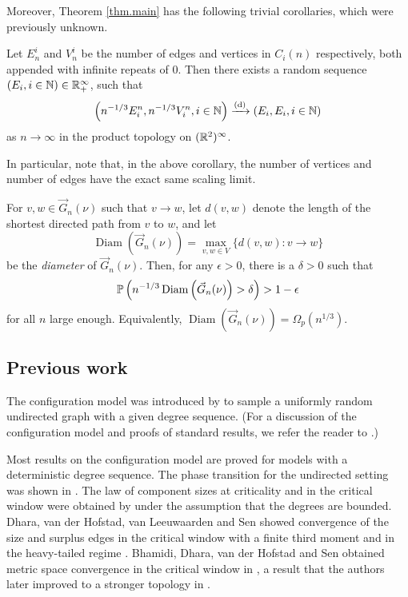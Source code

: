 Moreover, Theorem \ref{thm.main} has the following trivial corollaries, which were previously unknown. 
\begin{corollary}\label{cor.componentsizes}
Let $E^i_n$ and $V^i_n$ be the number of edges and vertices in $C_i(n)$ respectively, both appended with infinite repeats of $0$. Then there exists a random sequence $(E_i,i\in \N)\in \R_+^\infty$, such that
$$\left(n^{-1/3}E^n_i,n^{-1/3}V^n_i, i\in \N\right)\todist\left(E_i,E_i,i\in \N\right)$$
as $n\to \infty$ in the product topology on $(\R^2)^\infty$. 
\end{corollary}
In particular, note that, in the above corollary, the number of vertices and number of edges have the exact same scaling limit.
\begin{corollary}\label{cor.diameter}
For $v,w\in \vec{G}_n(\nu)$ such that $v\to w$, let $d(v,w)$ denote the length of the shortest directed path from $v$ to $w$, and let $$\operatorname{Diam}\left(\vec{G}_n(\nu)\right)=\max_{v,w\in V}\{d(v,w):v\to w\}$$ be the \emph{diameter} of $\vec{G}_n(\nu)$. Then, for any $\epsilon>0$, there is a $\delta>0$ such that $$\P\left( n^{-1/3}\operatorname{Diam}\left(\vec{G}_n(\nu)\right)>\delta\right)>1-\epsilon$$ for all $n$ large enough. Equivalently, $\operatorname{Diam}\left( \vec{G}_n(\nu) \right) = \Omega_p(n^{1/3})$.
\end{corollary}


\subsection{Previous work}\label{sec.previouswork}
The configuration model was introduced by \citet{Bollobas1980} to sample a uniformly random undirected graph with a given degree sequence. (For a discussion of the configuration model and proofs of standard results, we refer the reader to \cite[Chapter 7]{hofstadRandomGraphsComplex2017}.)

Most results on the configuration model are proved for models with a deterministic degree sequence. The phase transition for the undirected setting was shown in \cite{molloyCriticalPointRandom1995, Molloy1998, Janson2009}. The law of component sizes at criticality and in the critical window were obtained by \citet{Riordan2012} under the assumption that the degrees are bounded. Dhara, van der Hofstad, van Leeuwaarden and Sen showed convergence of the size and surplus edges in the critical window with a finite third moment \cite{Dhara2017} and in the heavy-tailed regime \cite{Dhara2020}.  Bhamidi, Dhara, van der Hofstad and Sen obtained metric space convergence in the critical window in \cite{Bhamidi2020}, a result that the authors later improved to a stronger topology in \cite{Bhamidi2020Glmb}. 


